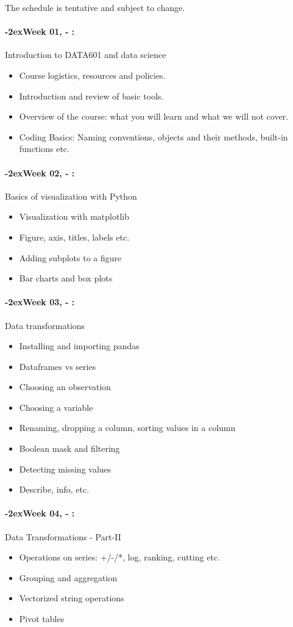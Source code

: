 \documentclass[11pt]{article}
\newcommand{\week}[1]{%
  \paragraph*{\kern-2ex\quad #1, \syldate{\today} - \AdvanceDate[4]\syldate{\today}:}%
  \ifdim\wd1=\wd\MONDAY
    \AdvanceDate[7]
  \else
    \AdvanceDate[7]
  \fi%
}
\begin{document}
The schedule is tentative and subject to change. 
\SetDate[06/09/2021]
\week{Week 01}  Introduction to DATA601 and data science
\begin{itemize}
\item Course logistics, resources and policies.
\item Introduction and review of basic tools.
\item Overview of the course: what you will learn and what we will not cover. 
\item Coding Basics: Naming conventions, objects and their methods, built-in functions etc.
\end{itemize}

\week{Week 02} Basics of visualization with Python
\begin{itemize}
\item Visualization with matplotlib
\item Figure, axis, titles, labels etc.
\item Adding subplots to a figure
\item Bar charts and box plots
\end{itemize}

\week{Week 03} Data transformations
\begin{itemize}
\item Installing and importing pandas
\item Dataframes vs series
\item Choosing an observation
\item Choosing a variable
\item Renaming, dropping a column, sorting values in a column
\item Boolean mask and filtering
\item Detecting missing values
\item Describe, info, etc. 
\end{itemize}

\week{Week 04} Data Transformations - Part-II
\begin{itemize}
\item Operations on series: +/-/*, log, ranking, cutting etc.
\item Grouping and aggregation
\item Vectorized string operations
\item Pivot tables
\end{itemize}
\end{document}
